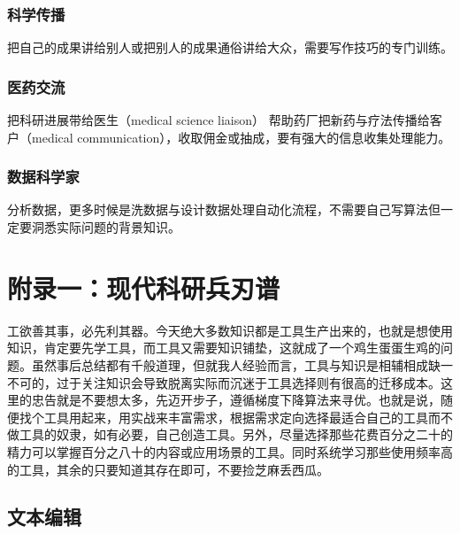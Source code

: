\documentclass[]{tufte-book}
\begin{document}
\hypertarget{ux79d1ux5b66ux4f20ux64ad}{%
\subsection{科学传播}\label{ux79d1ux5b66ux4f20ux64ad}}

把自己的成果讲给别人或把别人的成果通俗讲给大众，需要写作技巧的专门训练。

\hypertarget{ux533bux836fux4ea4ux6d41}{%
\subsection{医药交流}\label{ux533bux836fux4ea4ux6d41}}

把科研进展带给医生（medical science liaison）
帮助药厂把新药与疗法传播给客户（medical communication），收取佣金或抽成，要有强大的信息收集处理能力。

\hypertarget{ux6570ux636eux79d1ux5b66ux5bb6}{%
\subsection{数据科学家}\label{ux6570ux636eux79d1ux5b66ux5bb6}}

分析数据，更多时候是洗数据与设计数据处理自动化流程，不需要自己写算法但一定要洞悉实际问题的背景知识。

\hypertarget{tool}{%
\chapter*{附录一：现代科研兵刃谱}\label{tool}}

工欲善其事，必先利其器。今天绝大多数知识都是工具生产出来的，也就是想使用知识，肯定要先学工具，而工具又需要知识铺垫，这就成了一个鸡生蛋蛋生鸡的问题。虽然事后总结都有千般道理，但就我人经验而言，工具与知识是相辅相成缺一不可的，过于关注知识会导致脱离实际而沉迷于工具选择则有很高的迁移成本。这里的忠告就是不要想太多，先迈开步子，遵循梯度下降算法来寻优。也就是说，随便找个工具用起来，用实战来丰富需求，根据需求定向选择最适合自己的工具而不做工具的奴隶，如有必要，自己创造工具。另外，尽量选择那些花费百分之二十的精力可以掌握百分之八十的内容或应用场景的工具。同时系统学习那些使用频率高的工具，其余的只要知道其存在即可，不要捡芝麻丢西瓜。

\hypertarget{ux6587ux672cux7f16ux8f91}{%
\section*{文本编辑}\label{ux6587ux672cux7f16ux8f91}}
\end{document}
